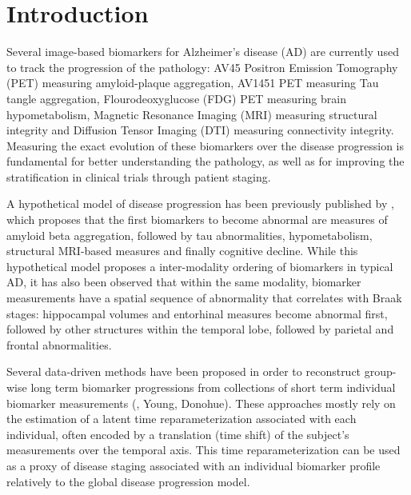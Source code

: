 \documentclass{llncs}
\begin{document}
\section{Introduction}


Several image-based biomarkers for Alzheimer's disease (AD) are currently used to track the progression of the pathology: AV45 Positron Emission Tomography (PET) measuring amyloid-plaque aggregation, AV1451 PET measuring Tau tangle aggregation, Flourodeoxyglucose (FDG) PET measuring brain hypometabolism, Magnetic Resonance Imaging (MRI) measuring structural integrity and Diffusion Tensor Imaging (DTI) measuring connectivity integrity. Measuring the exact evolution of these biomarkers over the disease progression is fundamental for better understanding the pathology, as well as for improving the stratification in clinical trials through patient staging.

A hypothetical model of disease progression has been previously published by \cite{jack2010hypothetical}, which proposes that the first biomarkers to become abnormal are measures of amyloid beta aggregation, followed by tau abnormalities, hypometabolism, structural MRI-based measures and finally cognitive decline. While this hypothetical model proposes a inter-modality ordering of biomarkers in typical AD, it has also been observed that within the same modality, biomarker measurements have a spatial sequence of abnormality that correlates with Braak stages: hippocampal volumes and entorhinal measures become abnormal first, followed by other structures within the temporal lobe, followed by parietal and frontal abnormalities.

Several data-driven methods have been proposed in order to reconstruct group-wise long term biomarker progressions from collections of short term individual biomarker measurements (\cite{lorenzi2017disease}, Young, Donohue). These approaches mostly rely on the estimation of a latent time reparameterization associated with each individual, often encoded by a translation (time shift) of the subject's measurements over the temporal axis.  This time reparameterization can be used as a proxy of disease staging associated with an individual biomarker profile relatively to the global disease progression model. 
\end{document}
